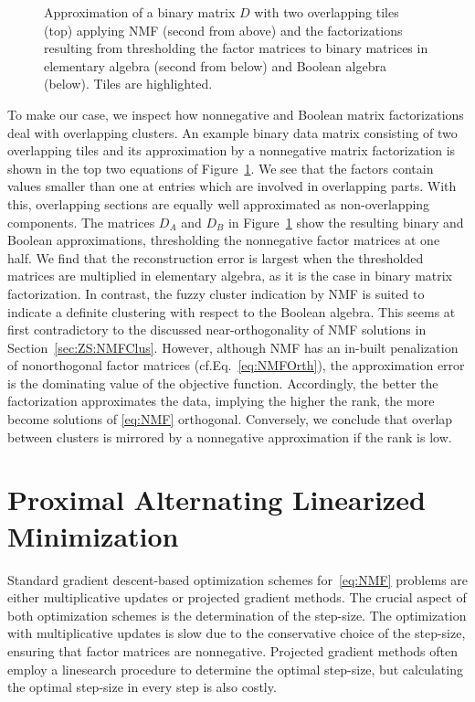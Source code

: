 \begin{figure}
\centering

\caption{Approximation of a binary matrix $D$ with two overlapping tiles (top) applying NMF (second from above) and the factorizations resulting from thresholding the factor matrices to binary matrices in elementary algebra (second from below) and Boolean algebra (below). Tiles are highlighted.}
\label{fig:overlapFact}
\end{figure}
To make our case, we inspect how nonnegative and Boolean matrix factorizations deal with overlapping clusters. An example binary data matrix consisting of two  overlapping tiles and its approximation by a nonnegative matrix factorization is shown in the top two equations of Figure~\ref{fig:overlapFact}. We see that the factors contain values smaller than one at entries which are involved in overlapping parts. With this, overlapping sections are equally well approximated as non-overlapping components. 
The matrices $D_A$ and $D_B$ in Figure~\ref{fig:overlapFact} show the resulting binary and Boolean approximations, thresholding the nonnegative factor matrices at one half. We find that the reconstruction error is largest when the thresholded matrices are multiplied in elementary algebra, as it is the case in binary matrix factorization. In contrast, the fuzzy cluster indication by NMF is suited to indicate a definite clustering with respect to the Boolean algebra. This seems at first contradictory to the discussed near-orthogonality of NMF solutions in Section~\ref{sec:ZS:NMFClus}. However, although NMF has an in-built penalization of nonorthogonal factor matrices (cf.\@ Eq.~\eqref{eq:NMFOrth}), the approximation error is the dominating value of the objective function. Accordingly, the better the factorization approximates the data, implying the higher the rank, the more become solutions of \ref{eq:NMF} orthogonal. Conversely, we conclude that overlap between clusters is mirrored by a nonnegative approximation if the rank is low.   
\section{Proximal Alternating Linearized Minimization}
Standard gradient descent-based optimization schemes for~\ref{eq:NMF} problems are either multiplicative updates or projected gradient methods. The crucial aspect of both optimization schemes is the determination of the step-size. The optimization with multiplicative updates is slow due to the conservative choice  of the step-size, ensuring that factor matrices are nonnegative. Projected gradient methods often employ a linesearch procedure to determine the optimal step-size, but calculating the optimal step-size in every step is also costly.

